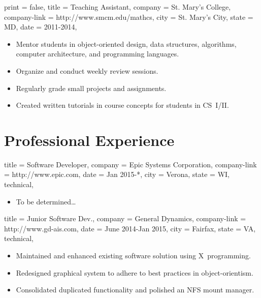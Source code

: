 \documentclass{simplecv}
\begin{document}
\begin{position}
  {
    print   = false,
    title   = Teaching Assistant,
    company = St. Mary's College,
    company-link = http://www.smcm.edu/mathcs,
    city    = St. Mary's City,
    state   = MD,
    date    = 2011-2014,
  }

\begin{itemize}
\item Mentor students in object-oriented design, data structures, algorithms, computer architecture, and programming languages.
\item Organize and conduct weekly review sessions.
\item Regularly grade small projects and assignments.
\item Created written tutorials in course concepts for students in CS~I\slash II.
\end{itemize}
\end{position}

\vfill\vfill
\section{Professional Experience}

\begin{position}
  {
    title   = Software Developer,
    company = Epic Systems Corporation,
    company-link = http://www.epic.com,
    date    = Jan 2015-*,
    city    = Verona,
    state   = WI,
    technical,
  }

\begin{itemize}
\item To be determined\dots
\end{itemize}
\end{position}

\begin{position}
  {
    title   = Junior Software Dev.,
    company = General Dynamics,
    company-link = http://www.gd-ais.com,
    date    = June 2014-Jan 2015,
    city    = Fairfax,
    state   = VA,
    technical,
  }

\begin{itemize}
\item Maintained and enhanced existing software solution using X~programming.
\item Redesigned graphical system to adhere to best practices in object-orientism.
\item Consolidated duplicated functionality and polished an NFS mount manager.
\end{itemize}
\end{position}
\end{document}
